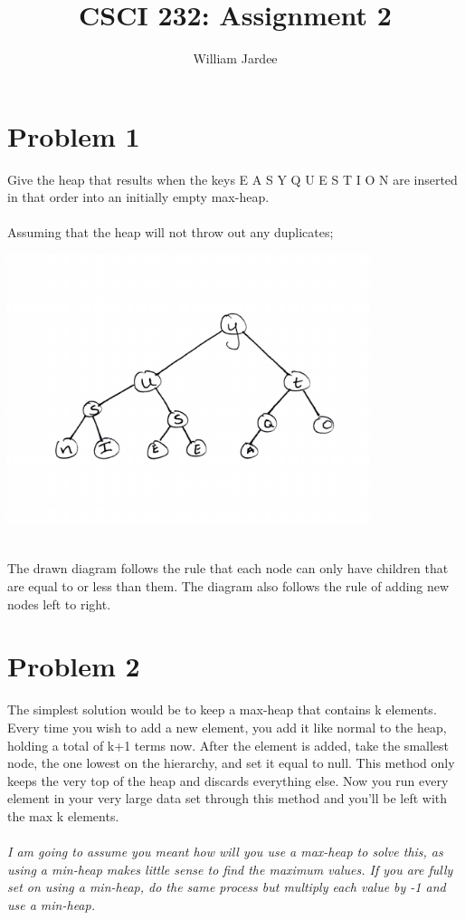 \documentclass[11pt]{article}
\begin{document}
\date{}

\title{CSCI 232: Assignment 2}

\author{William Jardee}

\maketitle


\section*{Problem 1}
Give the heap that results when the keys E A S Y Q U E S T I O N are inserted in that order into an initially empty max-heap.\\\\

Assuming that the heap will not throw out any duplicates; \\

\parbox{0}{ \includegraphics[width = 300pt]{Homework_2/max_heap(1).pdf}}\\
The drawn diagram follows the rule that each node can only have children that are equal to or less than them. The diagram also follows the rule of adding new nodes left to right.
\newpage

\section*{Problem 2}
The simplest solution would be to keep a max-heap that contains k elements. Every time you wish to add a new element, you add it like normal to the heap, holding a total of k+1 terms now. After the element is added, take the smallest node, the one lowest on the hierarchy, and set it equal to null. This method only keeps the very top of the heap and discards everything else. Now you run every element in your very large data set through this method and you'll be left with the max k elements.\\\\
\textit{I am going to assume you meant how will you use a max-heap to solve this, as using a min-heap makes little sense to find the maximum values. If you are fully set on using a min-heap, do the same process but multiply each value by -1 and use a min-heap.}
\end{document}
